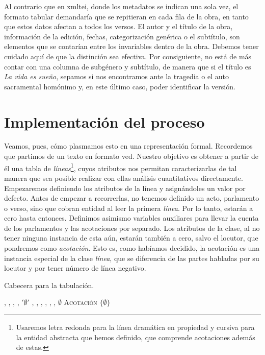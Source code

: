 Al contrario que en \ac{xmltei}, donde los metadatos se indican una sola vez, el formato tabular demandaría que se repitieran en cada fila de la obra, en tanto que estos datos afectan a todos los versos. El autor y el título de la obra, información de la edición, fechas, categorización genérica o el subtítulo, son elementos que se contarían entre los invariables dentro de la obra. Debemos tener cuidado aquí de que la distinción sea efectiva. Por consiguiente, no está de más contar con una columna de subgénero y subtítulo, de manera que si el título es \textit{La vida es sueño}, sepamos si nos encontramos ante la tragedia o el auto sacramental homónimo y, en este último caso, poder identificar la versión.

\section{Implementación del proceso}

Veamos, pues, cómo plasmamos esto en una representación formal. Recordemos que partimos de un texto en formato \ac{ved}. Nuestro objetivo es obtener a partir de él una tabla de \textit{líneas}\footnote{Usaremos letra redonda para la línea dramática en propiedad y cursiva para la entidad abstracta que hemos definido, que comprende acotaciones además de estas.}, cuyos atributos nos permitan caracterizarlas de tal manera que sea posible realizar con ellas análisis cuantitativos directamente. Empezaremos definiendo los atributos de la línea y asignándoles un valor por defecto. Antes de empezar a recorrerlas, no tenemos definido un acto, parlamento o verso, sino que cobran entidad al leer la primera \textit{línea}. Por lo tanto, estarán a cero hasta entonces. Definimos asimismo variables auxiliares para llevar la cuenta de los parlamentos y las acotaciones por separado. Los atributos de la clase, al no tener ninguna instancia de esta aún, estarán también a cero, salvo el locutor, que pondremos como \textit{acotación}. Esto es, como habíamos decidido, la acotación es una instancia especial de la clase \textit{línea}, que se diferencia de las partes habladas por su locutor y por tener número de línea negativo.

\begin{algorithm}[!ht]
	\caption{Cabecera para la tabulación.}\label{list:normal1}
	\acto, \parlamento, \verso, \nparlamento, \nacotacion  {} \;
	\p \gets $'\emptyset'$ \;
	\autor, \titulo, \genero, \sexo, \s, \edicion, \fecha \gets $\emptyset$ \;
	\personaje \gets \textsc{Acotación} \;
	\tabla \gets {} \;
	\nombres \gets $\{\emptyset\}$ \;
\end{algorithm}

